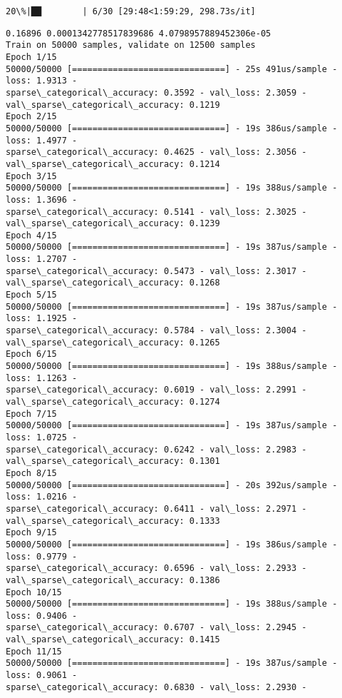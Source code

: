 \documentclass[11pt]{article}
\begin{document}
    \begin{Verbatim}[commandchars=\\\{\}]
 20\%|██        | 6/30 [29:48<1:59:29, 298.73s/it]
    \end{Verbatim}

    \begin{Verbatim}[commandchars=\\\{\}]
0.16896 0.0001342778517839686 4.0798957889452306e-05
Train on 50000 samples, validate on 12500 samples
Epoch 1/15
50000/50000 [==============================] - 25s 491us/sample - loss: 1.9313 -
sparse\_categorical\_accuracy: 0.3592 - val\_loss: 2.3059 -
val\_sparse\_categorical\_accuracy: 0.1219
Epoch 2/15
50000/50000 [==============================] - 19s 386us/sample - loss: 1.4977 -
sparse\_categorical\_accuracy: 0.4625 - val\_loss: 2.3056 -
val\_sparse\_categorical\_accuracy: 0.1214
Epoch 3/15
50000/50000 [==============================] - 19s 388us/sample - loss: 1.3696 -
sparse\_categorical\_accuracy: 0.5141 - val\_loss: 2.3025 -
val\_sparse\_categorical\_accuracy: 0.1239
Epoch 4/15
50000/50000 [==============================] - 19s 387us/sample - loss: 1.2707 -
sparse\_categorical\_accuracy: 0.5473 - val\_loss: 2.3017 -
val\_sparse\_categorical\_accuracy: 0.1268
Epoch 5/15
50000/50000 [==============================] - 19s 387us/sample - loss: 1.1925 -
sparse\_categorical\_accuracy: 0.5784 - val\_loss: 2.3004 -
val\_sparse\_categorical\_accuracy: 0.1265
Epoch 6/15
50000/50000 [==============================] - 19s 388us/sample - loss: 1.1263 -
sparse\_categorical\_accuracy: 0.6019 - val\_loss: 2.2991 -
val\_sparse\_categorical\_accuracy: 0.1274
Epoch 7/15
50000/50000 [==============================] - 19s 387us/sample - loss: 1.0725 -
sparse\_categorical\_accuracy: 0.6242 - val\_loss: 2.2983 -
val\_sparse\_categorical\_accuracy: 0.1301
Epoch 8/15
50000/50000 [==============================] - 20s 392us/sample - loss: 1.0216 -
sparse\_categorical\_accuracy: 0.6411 - val\_loss: 2.2971 -
val\_sparse\_categorical\_accuracy: 0.1333
Epoch 9/15
50000/50000 [==============================] - 19s 386us/sample - loss: 0.9779 -
sparse\_categorical\_accuracy: 0.6596 - val\_loss: 2.2933 -
val\_sparse\_categorical\_accuracy: 0.1386
Epoch 10/15
50000/50000 [==============================] - 19s 388us/sample - loss: 0.9406 -
sparse\_categorical\_accuracy: 0.6707 - val\_loss: 2.2945 -
val\_sparse\_categorical\_accuracy: 0.1415
Epoch 11/15
50000/50000 [==============================] - 19s 387us/sample - loss: 0.9061 -
sparse\_categorical\_accuracy: 0.6830 - val\_loss: 2.2930 -

\end{Verbatim}
\end{document}
